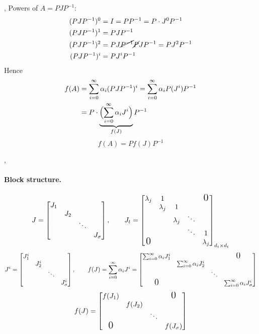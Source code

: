 \sep
Powers of $A = PJP^{-1}$:
\begin{align*}
(PJP^{-1})^0 &= I = PP^{-1} = P\cdot J^0P^{-1}\\
(PJP^{-1})^1 &= PJP^{-1}\\
(PJP^{-1})^2 &= PJ\cancel{P^{-1}}\cancel{P}JP^{-1} = PJ^2P^{-1}\\
(PJP^{-1})^i &= PJ^iP^{-1}
\end{align*}
Hence
\begin{align*}
f(A) &= \sum_{i=0}^{\infty}\alpha_i(PJP^{-1})^i = \sum_{i=0}^{\infty}\alpha_iP(J^i)P^{-1}\\
&= P\cdot\underbrace{\Bigl(\sum_{i=0}^{\infty}\alpha_iJ^i\Bigr)}_{f(J)}P^{-1}
\end{align*}
\[
\boxed{f(A) = Pf(J)P^{-1}}
\]

\sep
\paragraph{Block structure.}
\[
J = \begin{bmatrix}J_1 & & & \\ & J_2 & & \\ & & \ddots & \\ & & & J_\sigma\end{bmatrix},
\qquad
J_t = \begin{bmatrix}\lambda_j & 1 & & & \text{\Large 0}\\ & \lambda_j & 1 & & \\ & & \lambda_j & \ddots & \\ & & & \ddots & 1\\ \text{\Large 0} & & & & \lambda_j\end{bmatrix}_{d_t\times d_t}
\]
\[
J^i = \begin{bmatrix}J_1^i & & & \\ & J_2^i & & \\ & & \ddots & \\ & & & J_\sigma^i\end{bmatrix},
\qquad
f(J) = \sum_{i=0}^{\infty}\alpha_iJ^i = \begin{bmatrix}\sum_{i=0}^{\infty}\alpha_iJ_1^i & & & \text{\Large 0}\\ & \sum_{i=0}^{\infty}\alpha_iJ_2^i & & \\ & & \ddots & \\ \text{\Large 0} & & & \sum_{i=0}^{\infty}\alpha_iJ_\sigma^i\end{bmatrix}
\]
\[
f(J) = \begin{bmatrix}f(J_1) & & & \text{\Large 0}\\ & f(J_2) & & \\ & & \ddots & \\ \text{\Large 0} & & & f(J_\sigma)\end{bmatrix}
\]

